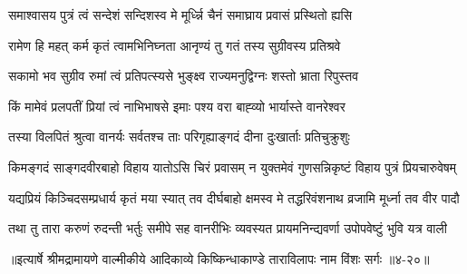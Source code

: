 \twolineshloka
{समाश्वासय पुत्रं त्वं सन्देशं सन्दिशस्व मे}
{मूर्ध्न्नि चैनं समाघ्राय प्रवासं प्रस्थितो ह्यसि} %

\twolineshloka
{रामेण हि महत् कर्म कृतं त्वामभिनिघ्नता}
{आनृण्यं तु गतं तस्य सुग्रीवस्य प्रतिश्रवे} %

\twolineshloka
{सकामो भव सुग्रीव रुमां त्वं प्रतिपत्स्यसे}
{भुङ्क्ष्व राज्यमनुद्विग्नः शस्तो भ्राता रिपुस्तव} %

\twolineshloka
{किं मामेवं प्रलपतीं प्रियां त्वं नाभिभाषसे}
{इमाः पश्य वरा बाह्व्यो भार्यास्ते वानरेश्वर} %

\twolineshloka
{तस्या विलपितं श्रुत्वा वानर्यः सर्वतश्च ताः}
{परिगृह्याङ्गदं दीना दुःखार्ताः प्रतिचुक्रुशुः} %

\twolineshloka
{किमङ्गदं साङ्गदवीरबाहो विहाय यातोऽसि चिरं प्रवासम्}
{न युक्तमेवं गुणसन्निकृष्टं विहाय पुत्रं प्रियचारुवेषम्} %

\twolineshloka
{यद्यप्रियं किञ्चिदसम्प्रधार्य कृतं मया स्यात् तव दीर्घबाहो}
{क्षमस्व मे तद्धरिवंशनाथ व्रजामि मूर्ध्ना तव वीर पादौ} %

\twolineshloka
{तथा तु तारा करुणं रुदन्ती भर्तुः समीपे सह वानरीभिः}
{व्यवस्यत प्रायमनिन्द्यवर्णा उपोपवेष्टुं भुवि यत्र वाली} %


॥इत्यार्षे श्रीमद्रामायणे वाल्मीकीये आदिकाव्ये किष्किन्धाकाण्डे ताराविलापः नाम विंशः सर्गः ॥४-२०॥
